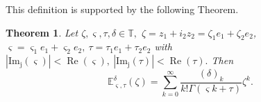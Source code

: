 \documentclass[a4paper,12pt]{article}
\newtheorem{theorem}{Theorem}[section]
\theoremstyle{remark}
\begin{document}
\noindent  This definition is supported by the following Theorem.
\begin{theorem}\label{th: ml}
Let $\zeta,  \varsigma,\tau, \delta\in \mathbb{T},$ 
$\zeta= z_1+i_2z_2= \zeta_1e_1+\zeta_2e_2$, $ \varsigma=  \varsigma_1e_1+ \varsigma_2e_2,  ~ \tau=\tau_1e_1+\tau_2e_2$ with $|\operatorname{Im_j}( \varsigma)|<\operatorname{Re}( \varsigma),~|\operatorname{Im_j}(\tau)|<\operatorname{Re}(\tau).$ 
Then
\begin{equation}
\mathbb{E}_{ \varsigma,\tau}^\delta(\zeta)=\sum_{k=0}^{\infty}\frac{(\delta)_k}{k!\Gamma( \varsigma k+\tau )}\zeta^k.  \end{equation}
\end{theorem}
\end{document}
